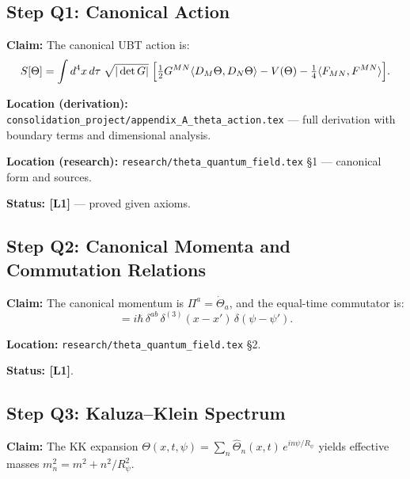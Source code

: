 \subsection{Step Q1: Canonical Action}

\textbf{Claim:} The canonical UBT action is:
\begin{equation}
  S[\Theta]
  = \int d^4x\,d\tau\;\sqrt{|\det G|}\;
    \Bigl[
      \tfrac{1}{2}G^{MN}\langle D_M\Theta, D_N\Theta\rangle
      - V(\Theta)
      - \tfrac{1}{4}\langle F_{MN}, F^{MN}\rangle
    \Bigr].
\end{equation}

\textbf{Location (derivation):}
\texttt{consolidation\_project/appendix\_A\_theta\_action.tex} — full derivation
with boundary terms and dimensional analysis.

\textbf{Location (research):}
\texttt{research/theta\_quantum\_field.tex} §1 — canonical form and sources.

\textbf{Status: [L1]} — proved given axioms.

\subsection{Step Q2: Canonical Momenta and Commutation Relations}

\textbf{Claim:} The canonical momentum is $\Pi^a = \dot\Theta_a$, and the
equal-time commutator is:
\begin{equation}
  [\Theta_a(x,\psi), \Pi^b(x',\psi')] = i\hbar\,\delta^{ab}\,
  \delta^{(3)}(x-x')\,\delta(\psi-\psi').
\end{equation}

\textbf{Location:} \texttt{research/theta\_quantum\_field.tex} §2.

\textbf{Status: [L1]}.

\subsection{Step Q3: Kaluza--Klein Spectrum}

\textbf{Claim:} The KK expansion
$\Theta(x,t,\psi) = \sum_n \hat\Theta_n(x,t)\,e^{in\psi/R_\psi}$
yields effective masses $m_n^2 = m^2 + n^2/R_\psi^2$.

